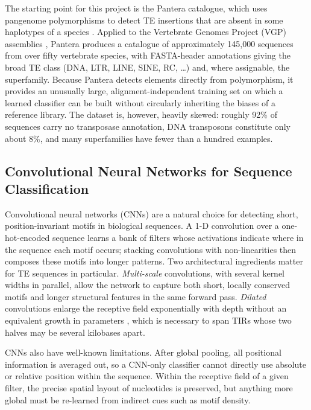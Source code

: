 \documentclass[12pt]{article}
\begin{document}
The starting point for this project is the Pantera catalogue, which uses pangenome polymorphisms to detect TE insertions that are absent in some haplotypes of a species \cite{sierra2024pantera}. Applied to the Vertebrate Genomes Project (VGP) assemblies \cite{rhie2021vgp}, Pantera produces a catalogue of approximately 145{,}000 sequences from over fifty vertebrate species, with FASTA-header annotations giving the broad TE class (DNA, LTR, LINE, SINE, RC, \dots) and, where assignable, the superfamily. Because Pantera detects elements directly from polymorphism, it provides an unusually large, alignment-independent training set on which a learned classifier can be built without circularly inheriting the biases of a reference library. The dataset is, however, heavily skewed: roughly 92\% of sequences carry no transposase annotation, DNA transposons constitute only about 8\%, and many superfamilies have fewer than a hundred examples.

\subsection{Convolutional Neural Networks for Sequence Classification}

Convolutional neural networks (CNNs) \cite{lecun2015deep,krizhevsky2012imagenet,alipanahi2015deepbind} are a natural choice for detecting short, position-invariant motifs in biological sequences. A 1-D convolution over a one-hot-encoded sequence learns a bank of filters whose activations indicate where in the sequence each motif occurs; stacking convolutions with non-linearities then composes these motifs into longer patterns. Two architectural ingredients matter for TE sequences in particular. \emph{Multi-scale} convolutions, with several kernel widths in parallel, allow the network to capture both short, locally conserved motifs and longer structural features in the same forward pass. \emph{Dilated} convolutions enlarge the receptive field exponentially with depth without an equivalent growth in parameters \cite{yu2016dilated}, which is necessary to span TIRs whose two halves may be several kilobases apart.

CNNs also have well-known limitations. After global pooling, all positional information is averaged out, so a CNN-only classifier cannot directly use absolute or relative position within the sequence. Within the receptive field of a given filter, the precise spatial layout of nucleotides is preserved, but anything more global must be re-learned from indirect cues such as motif density.
\end{document}

